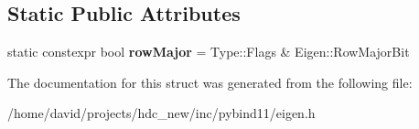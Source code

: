 \subsection*{Static Public Attributes}
\begin{DoxyCompactItemize}
\item 
static constexpr bool {\bfseries row\+Major} = Type\+::\+Flags \& Eigen\+::\+Row\+Major\+Bit\hypertarget{structtype__caster_3_01_type_00_01typename_01std_1_1enable__if_3_01is__eigen__sparse_3_01_type_01_4_1_1value_01_4_1_1type_01_4_a72bd438a2927e8e41431d8a527ae6b6b}{}\label{structtype__caster_3_01_type_00_01typename_01std_1_1enable__if_3_01is__eigen__sparse_3_01_type_01_4_1_1value_01_4_1_1type_01_4_a72bd438a2927e8e41431d8a527ae6b6b}

\end{DoxyCompactItemize}


The documentation for this struct was generated from the following file\+:\begin{DoxyCompactItemize}
\item 
/home/david/projects/hdc\+\_\+new/inc/pybind11/eigen.\+h\end{DoxyCompactItemize}
